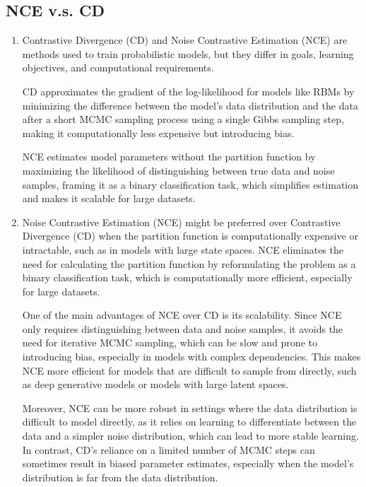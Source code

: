 \documentclass{article}
\begin{document}
\subsection{NCE v.s. CD}
\begin{enumerate}
\item 
Contrastive Divergence (CD) and Noise Contrastive Estimation (NCE) are methods used to train probabilistic models, but they differ in goals, learning objectives, and computational requirements.

CD approximates the gradient of the log-likelihood for models like RBMs by minimizing the difference between the model's data distribution and the data after a short MCMC sampling process using a single Gibbs sampling step, making it computationally less expensive but introducing bias.

NCE estimates model parameters without the partition function by maximizing the likelihood of distinguishing between true data and noise samples, framing it as a binary classification task, which simplifies estimation and makes it scalable for large datasets.
\item 
Noise Contrastive Estimation (NCE) might be preferred over Contrastive Divergence (CD) when the partition function is computationally expensive or intractable, such as in models with large state spaces. NCE eliminates the need for calculating the partition function by reformulating the problem as a binary classification task, which is computationally more efficient, especially for large datasets.

One of the main advantages of NCE over CD is its scalability. Since NCE only requires distinguishing between data and noise samples, it avoids the need for iterative MCMC sampling, which can be slow and prone to introducing bias, especially in models with complex dependencies. This makes NCE more efficient for models that are difficult to sample from directly, such as deep generative models or models with large latent spaces.

Moreover, NCE can be more robust in settings where the data distribution is difficult to model directly, as it relies on learning to differentiate between the data and a simpler noise distribution, which can lead to more stable learning. In contrast, CD’s reliance on a limited number of MCMC steps can sometimes result in biased parameter estimates, especially when the model's distribution is far from the data distribution.
\end{enumerate}
\end{document}

